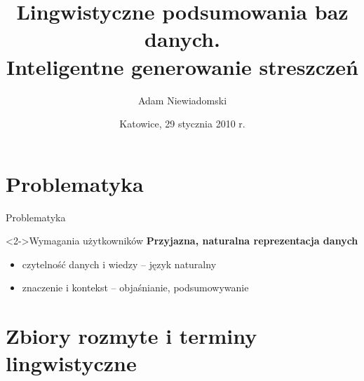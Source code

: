 \documentclass{beamer}
\title{Lingwistyczne podsumowania baz danych.\\Inteligentne generowanie streszczeń}
\author{Adam Niewiadomski}
\institute{Instytut Informatyki, Politechnika Łódzka}
\date{Katowice, 29 stycznia 2010 r.}
\begin{document}
\maketitle
\section{Problematyka}
\begin{frame}{Problematyka}%

\begin{block}<2->{Wymagania użytkowników}
	{\color{blue}\bfseries Przyjazna, naturalna reprezentacja danych}
	\begin{itemize}
		\item czytelność danych i wiedzy -- {\color{blue}język naturalny} 
		\item znaczenie i kontekst -- {\color{blue} objaśnianie, podsumowywanie}
	\end{itemize}
\end{block}

\end{frame}





\section{Zbiory rozmyte i terminy lingwistyczne}
\end{document}
